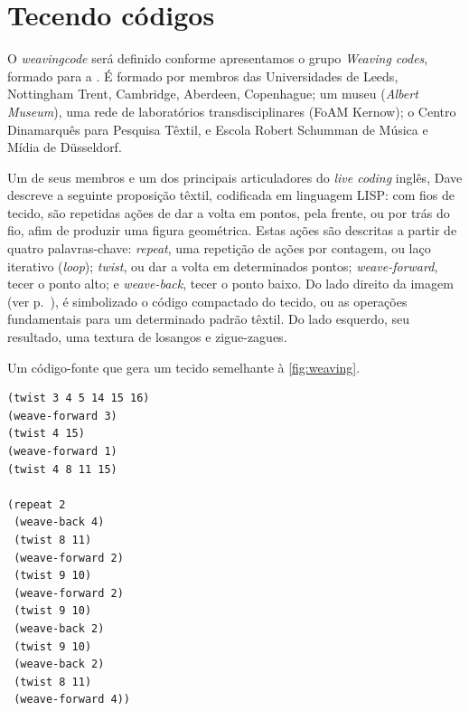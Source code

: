 \section{Tecendo códigos}\label{sec:weave}

O \emph{weavingcode} será definido conforme apresentamos o grupo \emph{Weaving codes}, formado para  a . É formado por membros das Universidades de Leeds, Nottingham Trent, Cambridge, Aberdeen, Copenhague; um museu (\emph{Albert Museum}), uma rede de laboratórios transdisciplinares (FoAM Kernow); o Centro Dinamarquês para Pesquisa Têxtil, e Escola Robert Schumman de Música e Mídia de  Düsseldorf.

Um de seus membros e um dos principais articuladores do \emph{live coding} inglês, Dave  descreve a seguinte proposição têxtil, codificada em linguagem LISP: com fios de tecido, são repetidas ações de dar a volta em pontos, pela frente, ou por trás do fio, afim de produzir uma figura geométrica. Estas ações são descritas a partir de quatro palavras-chave: \emph{repeat}, uma repetição de ações por contagem, ou laço iterativo (\emph{loop}); \emph{twist}, ou dar a volta em determinados pontos; \emph{weave-forward}, tecer o ponto alto; e \emph{weave-back}, tecer o ponto baixo. Do lado direito da imagem (ver p.~\pageref{fig:weaving}), é simbolizado o código compactado do tecido, ou as operações fundamentais para um determinado padrão têxtil. Do lado esquerdo, seu resultado, uma textura de losangos e zigue-zagues.  

\begin{example}{Um código-fonte que gera um tecido semelhante à \autoref{fig:weaving}.}
\label{ex:weaving}

\begin{verbatim}
(twist 3 4 5 14 15 16)
(weave-forward 3)
(twist 4 15)
(weave-forward 1)
(twist 4 8 11 15)

(repeat 2
 (weave-back 4)
 (twist 8 11)
 (weave-forward 2)
 (twist 9 10)
 (weave-forward 2)
 (twist 9 10)
 (weave-back 2)
 (twist 9 10)
 (weave-back 2)
 (twist 8 11)
 (weave-forward 4))
\end{verbatim}
\end{example}


